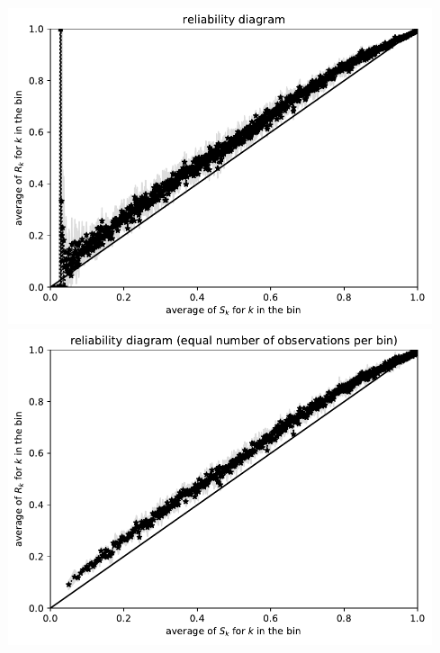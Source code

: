 \documentclass{article}
\begin{document}
\begin{figure}
\begin{centering}
\parbox{\imsize}{\includegraphics[width=\imsize]
                {./codes/unweighted/fullequiprob1000}}
\quad\quad
\parbox{\imsize}{\includegraphics[width=\imsize]
                {./codes/unweighted/fullequisamp1000}}

\vspace{\vertsep}


\end{centering}
\end{figure}
\end{document}
